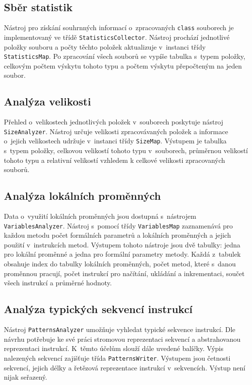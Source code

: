 \subsection{Sběr statistik}

Nástroj pro získání souhrnných informací o~zpracovaných \texttt{class} souborech je implementovaný ve třídě \texttt{StatisticsCollector}. Nástroj prochází jednotlivé položky souboru a  počty těchto položek aktualizuje v~instanci třídy \texttt{StatisticsMap}. Po zpracování všech souborů se vypíše tabulka s~typem položky, celkovým počtem výskytu tohoto typu a počtem výskytu přepočteným na jeden soubor. 

\subsection{Analýza velikosti}

Přehled o~velikostech jednotlivých položek v~souborech poskytuje nástroj \texttt{SizeAnalyzer}. Nástroj určuje velikosti zpracovávaných položek a informace o~jejich velikostech udržuje v~instanci třídy \texttt{SizeMap}. Výstupem je tabulka s~typem položky, celkovou velikostí tohoto typu v~souborech, průměrnou velikostí tohoto typu a relativní velikostí vzhledem k celkové velikosti zpracovaných souborů. 

\subsection{Analýza lokálních proměnných}

Data o~využití lokálních proměnných jsou dostupná s~nástrojem \texttt{VariablesAnalyzer}. Nástroj s~pomocí třídy \texttt{VariablesMap} zaznamenává pro každou metodu počet formálních parametrů a lokálních proměnných a jejich použití v~instrukcích metod. Výstupem tohoto nástroje jsou dvě tabulky: jedna pro lokální proměnné a jedna pro formální parametry metody. Každá z~tabulek obsahuje index do tabulky lokálních proměnných, počet metod, které s~danou proměnnou pracují, počet instrukcí pro načítání, ukládání a inkrementaci, součet všech instrukcí a průměrné hodnoty.

\subsection{Analýza typických sekvencí instrukcí}

Nástroj \texttt{PatternsAnalyzer} umožňuje vyhledat typické sekvence instrukcí. Dle návrhu potřebuje ke své práci stromovou reprezentaci sekvencí a abstrahovanou reprezentaci instrukcí. K~těmto účelům slouží dále uvedené balíčky. Výpis nalezených sekvencí zajišťuje třída \texttt{PatternsWriter}. Výstupem jsou četnosti sekvencí, jejich délky a řetězová reprezentace instrukcí v~sekvencích. Výstup není nijak seřazený.

